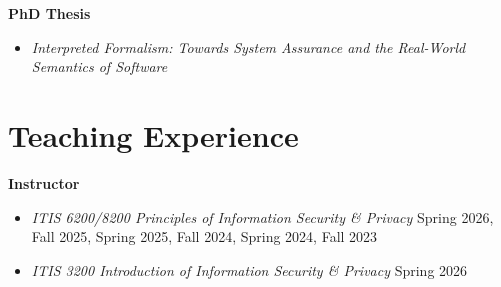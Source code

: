 \documentclass[11pt]{article}
\begin{document}
\textbf{PhD Thesis}
\begin{itemize}
\item \textit{Interpreted Formalism: Towards System Assurance and the Real-World Semantics of Software}
\end{itemize}




\section{Teaching Experience}
\textbf{Instructor}
\begin{itemize}
  \item \emph{ITIS 6200/8200 Principles of Information Security \& Privacy} \hfill Spring 2026, Fall 2025, Spring 2025, Fall 2024, Spring 2024, Fall 2023
\end{itemize}

\begin{itemize}
  \item \emph{ITIS 3200 Introduction of Information Security \& Privacy} \hfill Spring 2026
\end{itemize}



\end{document}
